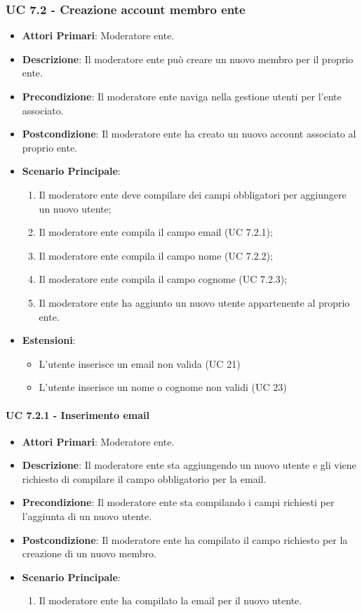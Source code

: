 			\subsubsection{UC 7.2 - Creazione account membro ente}
			\begin{itemize}
				\item \textbf{Attori Primari}: Moderatore ente.
				\item \textbf{Descrizione}: Il moderatore ente può creare un nuovo membro per il proprio ente.
				\item \textbf{Precondizione}: Il moderatore ente naviga nella gestione utenti per l'ente associato.
				\item \textbf{Postcondizione}: Il moderatore ente ha creato un nuovo account associato al proprio ente.
				\item \textbf{Scenario Principale}:
				\begin{enumerate}
					\item{Il moderatore ente deve compilare dei campi obbligatori per aggiungere un nuovo utente;}
					\item{Il moderatore ente compila il campo email (UC 7.2.1);}
					\item{Il moderatore ente compila il campo nome (UC 7.2.2);}
					\item{Il moderatore ente compila il campo cognome (UC 7.2.3);}
					\item{Il moderatore ente ha aggiunto un nuovo utente appartenente al proprio ente.}
				\end{enumerate}	
				\item \textbf{Estensioni}:
				\begin{itemize}
					\item L'utente inserisce un email non valida (UC 21)
					\item L'utente inserisce un nome o cognome non validi (UC 23)
				\end{itemize}
			\end{itemize}
			
			\paragraph{UC 7.2.1 - Inserimento email}
			\begin{itemize}
				\item \textbf{Attori Primari}: Moderatore ente.
				\item \textbf{Descrizione}: Il moderatore ente sta aggiungendo un nuovo utente e gli viene richiesto di compilare il campo obbligatorio per la email.
				\item \textbf{Precondizione}: Il moderatore ente sta compilando i campi richiesti per l'aggiunta di un nuovo utente.
				\item \textbf{Postcondizione}: Il moderatore ente ha compilato il campo richiesto per la creazione di un nuovo membro.
				\item \textbf{Scenario Principale}:
				\begin{enumerate}
					\item{Il moderatore ente ha compilato la email per il nuovo utente.}
				\end{enumerate}	
			\end{itemize}


